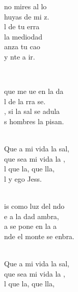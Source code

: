 \documentclass[12pt]{article}
\begin{document}
\begin{multicols*}{2}
\begin{cancion}
\begin{chorus}
	no mires al lo\\
	 huyas de mi z.\\
	l de tu erra\\
	la mediodad\\
	anza tu cao\\
	y nte a ir.\\
	\end{chorus}%
	\jump\\
\end{cancion}%

\begin{cancion}%
	 que me ue en la da\\
	l de la rra se. \\
	, si la sal se adula\\
	s hombres la pisan.\\\jump\\
	\begin{chorus}%
	Que a mi vida la sal,\\
	que sea mi vida la ,\\
	l que la,  que lla,\\
	l y ego Jess.\\
	\end{chorus}%
	\jump\\
	is como luz del ndo\\
	e a la dad ambra,\\
	a se pone en la a\\
	nde el monte se enbra.\\\jump\\
	\begin{chorus}%
	Que a mi vida la sal,\\
	que sea mi vida la ,\\
	l que la,  que lla,\\

\end{chorus}
\end{cancion}
\end{multicols*}
\end{document}
